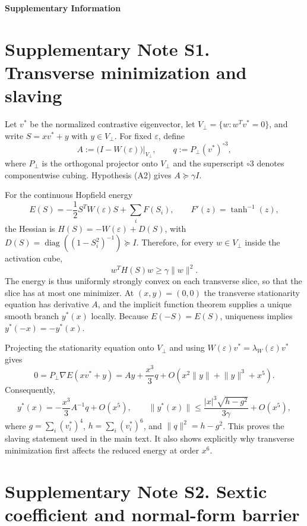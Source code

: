 \documentclass[a4paper,10pt]{article}
\begin{document}
\begin{center}
{\Large\bfseries Supplementary Information}
\end{center}

\section*{Supplementary Note S1. Transverse minimization and slaving}

Let $v^*$ be the normalized contrastive eigenvector, let
$V_\perp=\{w:w^Tv^*=0\}$, and write $S=xv^*+y$ with $y\in V_\perp$. For fixed
$\varepsilon$, define
\[
A:=\bigl(I-W(\varepsilon)\bigr)\big|_{V_\perp},\qquad
q:=P_\perp (v^*)^{\circ3},
\]
where $P_\perp$ is the orthogonal projector onto $V_\perp$ and the superscript
$\circ3$ denotes componentwise cubing. Hypothesis (A2) gives $A\succeq\gamma I$.

For the continuous Hopfield energy
\[
E(S)=-\frac12S^TW(\varepsilon)S+\sum_i F(S_i),\qquad
F'(z)=\tanh^{-1}(z),
\]
the Hessian is $H(S)=-W(\varepsilon)+D(S)$, with
$D(S)=\operatorname{diag}((1-S_i^2)^{-1})\succeq I$. Therefore, for every
$w\in V_\perp$ inside the activation cube,
\[
w^TH(S)w\geq\gamma\lVert w\rVert^2.
\]
The energy is thus uniformly strongly convex on each transverse slice, so that
the slice has at most one minimizer. At $(x,y)=(0,0)$ the transverse stationarity
equation has derivative $A$, and the implicit function theorem supplies a unique
smooth branch $y^*(x)$ locally. Because $E(-S)=E(S)$, uniqueness implies
$y^*(-x)=-y^*(x)$.

Projecting the stationarity equation onto $V_\perp$ and using
$W(\varepsilon)v^*=\lambda_W(\varepsilon)v^*$ gives
\[
0=P_\perp\nabla E(xv^*+y)
=Ay+\frac{x^3}{3}q+O(x^2\lVert y\rVert+\lVert y\rVert^3+x^5).
\]
Consequently,
\[
\boxed{y^*(x)=-\frac{x^3}{3}A^{-1}q+O(x^5)},
\qquad
\lVert y^*(x)\rVert
\leq\frac{|x|^3\sqrt{h-g^2}}{3\gamma}+O(x^5),
\]
where $g=\sum_i(v_i^*)^4$, $h=\sum_i(v_i^*)^6$, and
$\lVert q\rVert^2=h-g^2$. This proves the slaving statement used in the main
text. It also shows explicitly why transverse minimization first affects the
reduced energy at order $x^6$.

\section*{Supplementary Note S2. Sextic coefficient and normal-form barrier}
\end{document}
